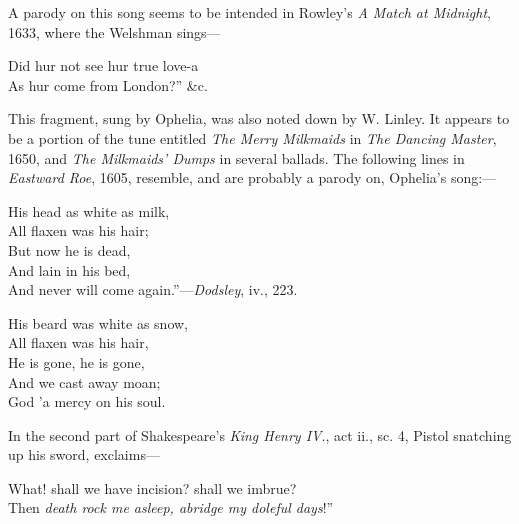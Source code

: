 A parody on this song seems to be intended in Rowley’s \textit{A Match at Midnight},
1633, where the Welshman sings—
\settowidth{\versewidth}{Did hur not see hur true love-a}
\begin{scverse}
Did hur not see hur true love-a\\
\vin As hur come from London?” \&c.
\end{scverse}


This fragment, sung by Ophelia, was also noted down by W. Linley. It
appears to be a portion of the tune entitled \textit{The Merry Milkmaids} in \textit{The Dancing
Master}, 1650, and \textit{The Milkmaids’ Dumps} in several ballads. The following lines
in \textit{Eastward Roe}, 1605, resemble, and are probably a parody on, Ophelia’s song:—
\settowidth{\versewidth}{His head as white as milk,}
\begin{scverse}
\begin{patverse}
His head as white as milk,\\
All flaxen was his hair;\\
But now he is dead,\\
And lain in his bed,\\
And never will come again.”—\textit{Dodsley}, iv., 223.
\end{patverse}
\end{scverse}



\begin{scverse}
\begin{patverse}
His beard was white as snow,\\
All flaxen was his hair,\\
He is gone, he is gone,\\
And we cast away moan;\\
God ’a mercy on his soul.
\end{patverse}
\end{scverse}


In the second part of Shakespeare’s \textit{King Henry IV}., act ii., sc. 4, Pistol
snatching up his sword, exclaims—
\begin{scverse}
What! shall we have incision? shall we imbrue?\\
Then \textit{death rock me asleep, abridge my doleful days}!”
\end{scverse}

